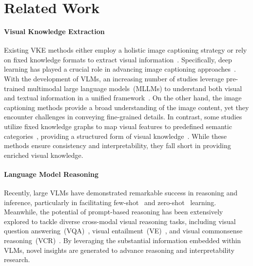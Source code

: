\section{Related Work}
\label{sec:related}
\paragraph{Visual Knowledge Extraction}
Existing VKE methods either employ a holistic image captioning strategy or rely on fixed knowledge formats to extract visual information~\citep{PV2TEA2023,llava12023}.
Specifically, deep learning has played a crucial role in advancing image captioning approaches~\citep{DLimgcap2018,DLimgcap2017}.
With the development of VLMs, an increasing number of studies leverage pre-trained multimodal large language models~(MLLMs) to understand both visual and textual information in a unified framework~\citep{promptcap2023,ISCimgcap2022}. 
On the other hand, the image captioning methods provide a broad understanding of the image content, yet they encounter challenges in conveying fine-grained details.
In contrast, some studies utilize fixed knowledge graphs to map visual features to predefined semantic categories~\citep{ivlr2024,VCHG2023}, providing a structured form of visual knowledge~\citep{covlm2024,BKG2GSG2020}. While these methods ensure consistency and interpretability, they fall short in providing enriched visual knowledge.
\paragraph{Language Model Reasoning}
Recently, large VLMs have demonstrated remarkable success in reasoning and inference, particularly in facilitating few-shot~\citep{cotrainfewshot2022,plmfewshot2021} and zero-shot~\citep{llm0shottrain2024,llm0shot2022} learning. 
Meanwhile, the potential of prompt-based reasoning has been extensively explored to tackle diverse cross-modal visual reasoning tasks, including visual question answering~(VQA)~\citep{repare2024,smola2024}, visual entailment~(VE)~\citep{esnlive2021}, and visual commonsense reasoning~(VCR)~\citep{rapper2024,nlxgpt2022}. 
By leveraging the substantial information embedded within VLMs, novel insights are generated to advance reasoning and interpretability research.